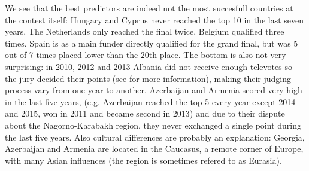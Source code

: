 \documentclass[a4paper,11pt]{report}
\begin{document}
We see that the best predictors are indeed not the most succesfull countries at the contest itself:
Hungary and Cyprus never reached the top 10 in the last seven years, The Netherlands only reached the final twice, Belgium qualified three times. Spain is as a main funder directly qualified for the grand final,
but was 5 out of 7 times placed lower than the 20th place. The bottom is also not very surprising: in 2010, 2012 and 2013 Albania did not 
receive enough televotes so the jury decided their points (see \cite{eurovision} for more information), making their judging process vary from one year to another.
Azerbaijan and Armenia scored very high in the last five years, (e.g. Azerbaijan reached the top 5
every year except 2014 and 2015, won in 2011 and became second in 2013) 
and due to their dispute about the Nagorno-Karabakh region, they never exchanged a 
single
point during the last five years. Also cultural differences are probably an 
explanation: Georgia, Azerbaijan and Armenia are located in the Caucasus, a remote corner of Europe, with 
many Asian influences (the region is sometimes refered to as Eurasia). 
\end{document}
